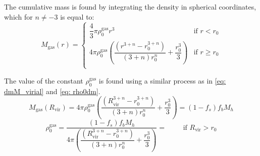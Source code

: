 			The cumulative mass is found by integrating the density in spherical coordinates, which for $n \neq -3$ is equal to:
			\begin{equation}
				M_\text{gas}(r) = \left \{
					\begin{matrix}
					\dfrac{4}{3}\pi\rho_0^\text{gas}r^3 & \text{if $r < r_0$} \\
					4\pi\rho_0^\text{gas}\left(\dfrac{\left(r^{3 + n} - r_0^{3 + n}\right)}{(3+n)r_0^{n}}  + \dfrac{r_0^3}{3}\right) & \text{if $r \geq r_0$} \\
					\end{matrix}
				\right.
			\end{equation}
			
			The value of the constant $\rho_0^\text{gas}$ is found using a similar process as in \autoref{eq: dmM_virial} and \ref{eq: rho0dm}.
			\begin{equation}
				M_\text{gas}(R_\text{vir}) = 4\pi\rho_0^\text{gas}\left(\dfrac{\left(R_\text{vir}^{3 + n} - r_0^{3 + n}\right)}{(3+n)r_0^{n}} + \dfrac{r_0^3}{3}\right) = (1 - f_s) f_bM_h
			\end{equation}
			\begin{equation}
				\rho_0^\text{gas} = \dfrac{(1 - f_s) f_bM_h}{4\pi \left(\dfrac{\left(R_\text{vir}^{3 + n} - r_0^{3 + n}\right)}{(3+n)r_0^{n}} + \dfrac{r_0^3}{3}\right)} = \qquad \text{ if $R_\text{vir} > r_0$}
			\end{equation}
			
